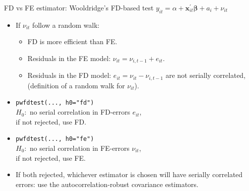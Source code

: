 \documentclass[usenames,dvipsnames]{beamer}
\begin{document}
\begin{frame}{FD vs FE estimator: Wooldridge's FD-based test}
$y_{it} = \alpha + \bm{x}^{\prime}_{it} \bm{\beta} + a_i + \nu_{it}$\\ \medskip
\begin{itemize}
    \item If $\nu_{it}$ follow a random walk: 
    \begin{itemize}
          \item FD is more efficient than FE.
          \item Residuals in the FE model: $\nu_{it}=\nu_{i,t-1}+e_{it}$.
          \item Residuals in the FD model: $e_{it} = \nu_{it}-\nu_{i,t-1}$ are not serially correlated, \\(definition of a random walk for $\nu_{it}$).
        \end{itemize}
        \smallskip
        \item \texttt{pwfdtest(..., h0="fd")} \\
        $H_0:$ no serial correlation in FD-errors $e_{it}$, \\if not rejected, use FD.
        \smallskip
        \item \texttt{pwfdtest(..., h0="fe")} \\
        $H_0:$ no serial correlation in FE-errors $\nu_{it}$, \\if not rejected, use FE.
        \smallskip
        \item If both rejected, whichever estimator is chosen will have serially correlated errors: use the autocorrelation-robust covariance estimators.
    \smallskip
\end{itemize}
\end{frame}
\end{document}
